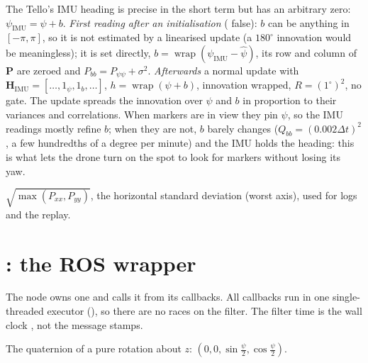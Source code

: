 The Tello's IMU heading is precise in the short term but has an arbitrary zero: $\psi_{\text{IMU}} = \psi + b$.
\emph{First reading after an initialisation} ( false): $b$ can be anything in $[-\pi,\pi]$, so it is not
estimated by a linearised update (a $180^\circ$ innovation would be meaningless); it is set directly,
$b = \operatorname{wrap}(\psi_{\text{IMU}} - \hat\psi)$, its row and column of $\mathbf P$ are zeroed and
$P_{bb} = P_{\psi\psi} + \sigma^2$. \emph{Afterwards} a normal update with $\mathbf H_{\text{IMU}} = [\ldots,1_\psi,1_b,\ldots]$,
$h = \operatorname{wrap}(\psi+b)$, innovation wrapped, $R = (1^\circ)^2$, no gate. The update spreads the innovation over
$\psi$ and $b$ in proportion to their variances and correlations. When markers are in view they pin $\psi$, so the IMU
readings mostly refine $b$; when they are not, $b$ barely changes ($Q_{bb}=(0.002\Delta t)^2$, a few hundredths of a degree
per minute) and the IMU holds the heading: this is what lets the drone turn on the spot to look for markers without losing
its yaw.

$\sqrt{\max(P_{xx},P_{yy})}$, the horizontal standard deviation (worst axis), used for logs and the replay.

\section[ekf\_node.py: the ROS wrapper]{: the ROS wrapper}

The node owns one  and calls it from its callbacks. All callbacks run in one single-threaded executor
(), so there are no races on the filter. The filter time is the wall clock , not the
message stamps.

The quaternion of a pure rotation about $z$: $(0, 0, \sin\frac\psi2, \cos\frac\psi2)$.

